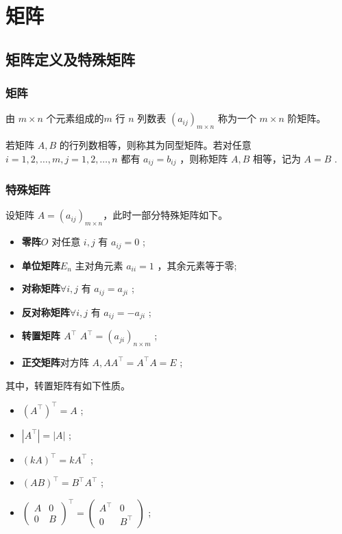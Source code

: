 \chapter{矩阵}

\section{矩阵定义及特殊矩阵}

\subsection{矩阵}

由 $ m\times n $ 个元素组成的$ m $ 行 $ n $ 列数表 $ (a_{ij})_{m\times n}$ 称为一个 $ m\times n $ 阶矩阵。

若矩阵 $ A,B $ 的行列数相等，则称其为同型矩阵。若对任意 $ i=1,2,\dots,m, j = 1,2,\dots,n $ 都有
$ a_{ij} = b_{ij} $ ，则称矩阵 $ A,B $ 相等，记为 $ A = B $ .

\subsection{特殊矩阵}

设矩阵 $ A = (a_{ij})_{m\times n} $，此时一部分特殊矩阵如下。

\begin{itemize}
    \item \textbf{零阵$ O $ }\quad 对任意 $ i,j $ 有 $ a_{ij} = 0 $ ;
    \item \textbf{单位矩阵$ E_n $ }\quad 主对角元素 $ a_{ii} = 1 $ ，其余元素等于零;
    \item \textbf{对称矩阵}\quad $\forall i,j $ 有 $ a_{ij} = a_{ji} $ ;
    \item \textbf{反对称矩阵}\quad $\forall i,j $ 有 $ a_{ij} = -a_{ji} $ ;
    \item \textbf{转置矩阵 $ A^\top $ }\quad $ A^\top = (a_{ji})_{n\times m} $ ;
    \item \textbf{正交矩阵}\quad 对方阵 $ A , AA^\top = A^\top A = E $ ;
\end{itemize}

其中，转置矩阵有如下性质。

\begin{itemize}
    \item $ (A^\top)^\top = A $ ;
    \item $ |A^\top|= |A| $ ;
    \item $ (kA)^\top = kA^\top$ ;
    \item $ (AB)^\top = B^\top A^\top $ ;
    \item $ \begin{pmatrix}
        A&0\\0&B
    \end{pmatrix}^\top = \begin{pmatrix}
        A^\top&0\\0&B^\top
    \end{pmatrix} $ ;
\end{itemize}

